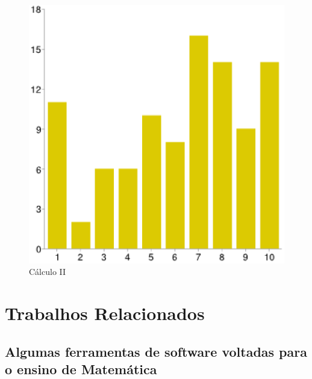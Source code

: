 \documentclass[12pt,a4paper]{article}
\begin{document}
\begin{figure}[htb]
	\center
	\includegraphics[scale=0.36]{imagens/12.eps} 
	\caption{Cálculo II}
	\label{fig:graCalc}
\end{figure}

\section{Trabalhos Relacionados}
\subsection{Algumas ferramentas de software voltadas para o ensino de Matemática} 
\end{document}
